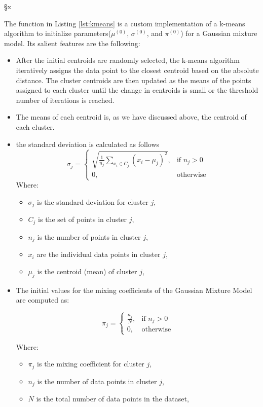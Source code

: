 §x\documentclass[]{article}
\begin{document}
The function in Listing \ref{lst:kmeans} is a custom implementation of a k-means algorithm to initialize parameters($\mu^{(0)}$, $\sigma^{(0)}$, and $\pi^{(0)}$) for a Gaussian mixture model. Its salient features are the following:
\begin{itemize}
	\item After the initial centroids are randomly selected, the k-means algorithm iteratively assigns the data point to the closest centroid based on the absolute distance. The cluster centroids are then updated as the means of the points assigned to each cluster until the change in centroids is small or the threshold number of iterations is reached.
	\item The means of each centroid is, as we have discussed above, the centroid of each cluster.
	\item the standard deviation is calculated as follows
	$$
	\sigma_j =
	\begin{cases}
		\sqrt{\frac{1}{n_j} \sum_{x_i \in C_j} (x_i - \mu_j)^2}, & \text{if } n_j > 0 \\
		0, & \text{otherwise}
	\end{cases}
	$$
	Where:
	\begin{itemize}
		\item $\sigma_j$ is the standard deviation for cluster $j$,
		\item $C_j$ is the set of points in cluster $j$,
		\item $n_j$ is the number of points in cluster $j$,
		\item $x_i$ are the individual data points in cluster $j$,
		\item $\mu_j$ is the centroid (mean) of cluster $j$,
	\end{itemize}
	
	\item The initial values for the mixing coefficients of the Gaussian Mixture Model are computed as:
	
	$$
	\pi_j =
	\begin{cases}
		\frac{n_j}{N}, & \text{if } n_j > 0 \\
		0, & \text{otherwise}
	\end{cases}
	$$
	
	Where:
	\begin{itemize}
		\item $\pi_j$ is the mixing coefficient for cluster $j$,
		\item $n_j$ is the number of data points in cluster $j$,
		\item $N$ is the total number of data points in the dataset,
	\end{itemize}
	
\end{itemize}
\end{document}
